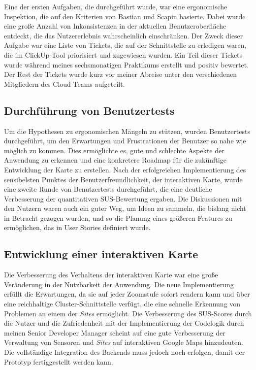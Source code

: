 Eine der ersten Aufgaben, die durchgeführt wurde, war eine ergonomische Inspektion, die auf den Kriterien von Bastian und Scapin basierte. Dabei wurde eine große Anzahl von Inkonsistenzen in der aktuellen Benutzeroberfläche entdeckt, die das Nutzererlebnis wahrscheinlich einschränken.
Der Zweck dieser Aufgabe war eine Liste von Tickets, die auf der Schnittstelle zu erledigen waren, die im ClickUp-Tool priorisiert und zugewiesen wurden.
Ein Teil dieser Tickets wurde während meines sechsmonatigen Praktikums erstellt und positiv bewertet.
Der Rest der Tickets wurde kurz vor meiner Abreise unter den verschiedenen Mitgliedern des Cloud-Teams aufgeteilt.

\subsection{Durchführung von Benutzertests}

Um die Hypothesen zu ergonomischen Mängeln zu stützen, wurden Benutzertests durchgeführt, um den Erwartungen und Frustrationen der Benutzer so nahe wie möglich zu kommen.
Dies ermöglichte es, gute und schlechte Aspekte der Anwendung zu erkennen und eine konkretere Roadmap für die zukünftige Entwicklung der Karte zu erstellen.
Nach der erfolgreichen Implementierung des sensibelsten Punktes der Benutzerfreundlichkeit, der interaktiven Karte, wurde eine zweite Runde von Benutzertests durchgeführt, die eine deutliche Verbesserung der quantitativen \ac{SUS}-Bewertung ergaben.
Die Diskussionen mit den Nutzern waren auch ein guter Weg, um Ideen zu sammeln, die bislang nicht in Betracht gezogen wurden, und so die Planung eines größeren Features zu ermöglichen, das in User Stories definiert wurde.

\subsection{Entwicklung einer interaktiven Karte}

Die Verbesserung des Verhaltens der interaktiven Karte war eine große Veränderung in der Nutzbarkeit der Anwendung.
Die neue Implementierung erfüllt die Erwartungen, da sie auf jeder Zoomstufe sofort rendern kann und über eine reichhaltige Cluster-Schnittstelle verfügt, die eine schnelle Erkennung von Problemen an einem der \textit{Sites} ermöglicht.
Die Verbesserung des \ac{SUS}-Scores durch die Nutzer und die Zufriedenheit mit der Implementierung der Codelogik durch meinen Senior Developer Manager scheint auf eine gute Verbesserung der Verwaltung von Sensoren und \textit{Sites} auf interaktiven Google Maps hinzudeuten.
Die vollständige Integration des Backends muss jedoch noch erfolgen, damit der Prototyp fertiggestellt werden kann.

